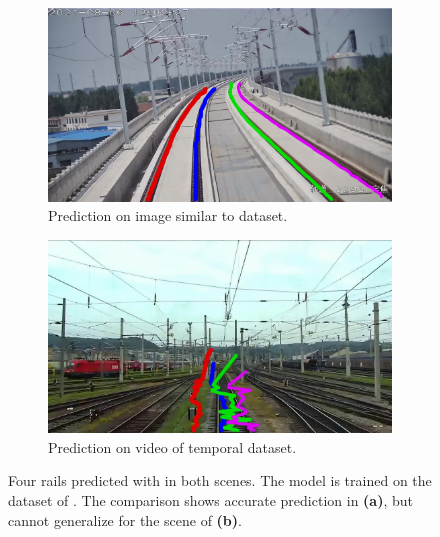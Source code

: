 \begin{figure}[H]
    \centering
    \begin{subfigure}{0.49\textwidth}
        \centering
        \includegraphics[width=\linewidth]{PICs/discussion/multirail_example.jpg}
        \caption{Prediction on image similar to dataset.}
        \label{fig:mutlirailTest_a}
    \end{subfigure}
    \hfill
    \begin{subfigure}{0.49\textwidth}
        \centering
        \includegraphics[width=\linewidth]{PICs/discussion/multirail.jpg}
        \caption{Prediction on video of temporal dataset.}
        \label{fig:mutlirailTest_b}
    \end{subfigure}
    \caption{Four rails predicted with \cite{li2022rail} in both scenes. The model is trained on the dataset of \cite{li2022rail}. The comparison shows accurate prediction in \textbf{(a)}, but cannot generalize for the scene of \textbf{(b)}.}
    \label{fig:mutlirailTest}
\end{figure}

